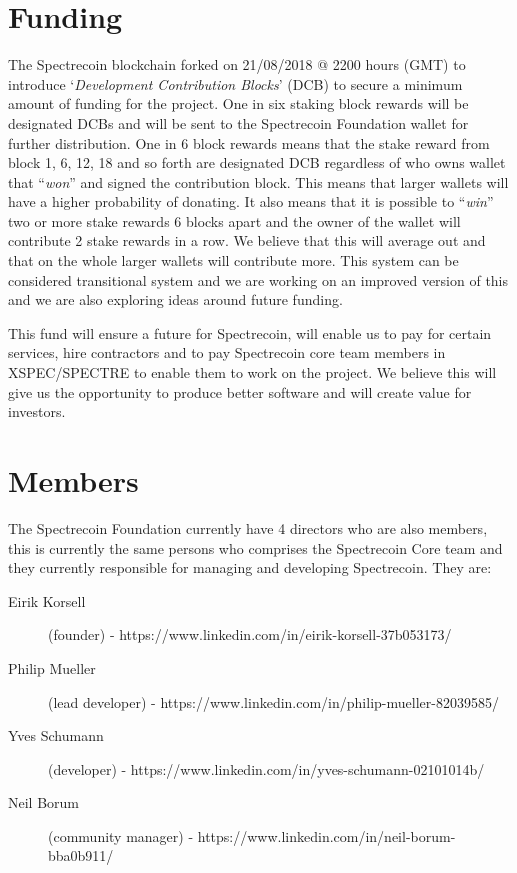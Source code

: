 \section{Funding}
The Spectrecoin blockchain forked on 21/08/2018 @ 2200 hours (GMT) to 
introduce ‘\textit{Development Contribution Blocks}’ (DCB) to secure a 
minimum amount of funding for the project. One in six staking block rewards 
will be designated DCBs and will be sent to the Spectrecoin Foundation 
wallet for further distribution. One in 6 block rewards means that the 
stake reward from block 1, 6, 12, 18 and so forth are designated DCB 
regardless of who owns wallet that “\textit{won}” and signed the 
contribution block. This means that larger wallets will have a higher 
probability of donating. It also means that it is possible to 
“\textit{win}” two or more stake rewards 6 blocks apart and the owner 
of the wallet will contribute 2 stake rewards in a row. We believe that 
this will average out and that on the whole larger wallets will contribute 
more. This system can be considered transitional system and we are working 
on an improved version of this and we are also exploring ideas around 
future funding.



This fund will ensure a future for Spectrecoin, will enable us to pay for 
certain services, hire contractors and to pay Spectrecoin core team members 
in XSPEC/SPECTRE to enable them to work on the project. We believe this 
will give us the opportunity to produce better software and will create 
value for investors.



\section{Members}
The Spectrecoin Foundation currently have 4 directors who are also members, 
this is currently the same persons who comprises the Spectrecoin Core team 
and they currently responsible for managing and developing Spectrecoin. 
They are:



\begin{description}
	\item[Eirik Korsell]  (founder) - https://www.linkedin.com/in/eirik-korsell-37b053173/
	\item[Philip Mueller] (lead developer) - https://www.linkedin.com/in/philip-mueller-82039585/
	\item[Yves Schumann] (developer) - https://www.linkedin.com/in/yves-schumann-02101014b/
	\item[Neil Borum] (community manager) - https://www.linkedin.com/in/neil-borum-bba0b911/
\end{description}



